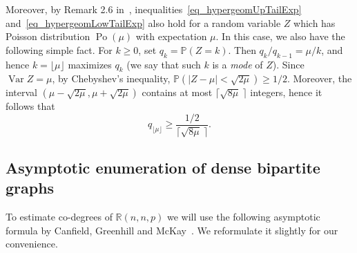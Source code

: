 \documentclass[12pt,reqno]{amsart}
\newcommand{\Var} {\operatorname {Var}}
\newcommand{\Prob} {\mathbb {P}}
\newcommand{\prob}[1]{\Prob\left(#1\right)}
\newcommand{\R} {\mathbb R}
\newcommand{\Po}{\operatorname{Po}}
\theoremstyle{definition}
\begin{document}
Moreover, by Remark 2.6 in~\cite{JLR}, inequalities~\eqref{eq_hypergeomUpTailExp} and~\eqref{eq_hypergeomLowTailExp} also hold for a random variable $Z$ which has Poisson distribution $\Po(\mu)$ with expectation $\mu$.
In this case, we also have the following simple fact.
For $k\ge0$, set $q_k=\prob{Z=k}$. Then $q_k/q_{k-1}=\mu/k$, and hence $k = \lfloor\mu\rfloor$ maximizes $q_k$ (we say that such $k$ is a \emph{mode} of $Z$). Since $\Var Z = \mu$, by Chebyshev's inequality, $\prob{|Z-\mu|<\sqrt{2\mu}}\ge1/2$. Moreover, the interval $(\mu - \sqrt{2 \mu}, \mu + \sqrt{2 \mu})$ contains at most $\lceil \sqrt{8\mu}\:\rceil$ integers, hence it follows that
\begin{equation}
  \label{eq_largestatom}
  q_{\lfloor \mu \rfloor} \ge \frac{1/2}{\lceil \sqrt{8\mu}\: \rceil}.
\end{equation}



\subsection{Asymptotic enumeration of dense bipartite graphs}
\label{ss_count}

To estimate co-degrees of $\R(n,n,p)$ we will use the following asymptotic formula by Canfield, Greenhill and McKay~\cite{CGM}. We reformulate it slightly for our convenience.
\end{document}
